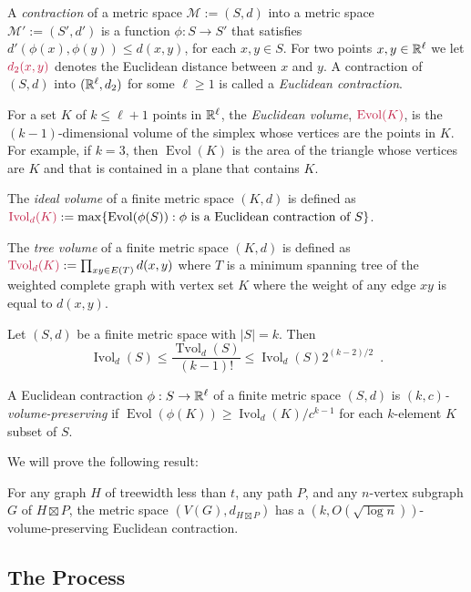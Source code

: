 \documentclass{patmorin}
\makeatletter
\newcommand{\defin}[1]{\emph{\textcolor{brightmaroon}{#1}}}
\def\mathcolor#1#{\@mathcolor{#1}}
\def\@mathcolor#1#2#3{%
  \protect\leavevmode
  \begingroup
    \color#1{#2}#3%
  \endgroup
}
\newcommand{\mathdefin}[1]{\mathcolor{brightmaroon}{#1}}
\DeclareMathOperator{\evol}{Evol}
\DeclareMathOperator{\ivol}{Ivol}
\DeclareMathOperator{\tvol}{Tvol}
\makeatother
\begin{document}
A \defin{contraction} of a metric space $\mathcal{M}:=(S,d)$ into a metric space $\mathcal{M'}:=(S',d')$ is a function $\phi:S\to S'$ that satisfies $d'(\phi(x),\phi(y))\le d(x,y)$, for each $x,y\in S$.  For two points $x,y\in\mathbb{R}^\ell$ we let $\mathdefin{d_2(x,y)}$ denotes the Euclidean distance between $x$ and $y$.  A contraction of $(S,d)$ into $(\mathbb{R}^\ell, d_2)$ for some $\ell\ge 1$ is called a \defin{Euclidean contraction}.


For a set $K$ of $k\le \ell+1$ points in $\mathbb{R}^\ell$, the \defin{Euclidean volume}, $\mathdefin{\evol(K)}$, is the $(k-1)$-dimensional volume of the simplex whose vertices are the points in $K$.  For example, if $k=3$, then $\evol(K)$ is the area of the triangle whose vertices are $K$ and that is contained in a plane that contains $K$.

The \defin{ideal volume} of a finite metric space $(K,d)$ is defined as $\mathdefin{\ivol_d(K)}:=\max\{\evol(\phi(S)):\text{$\phi$ is a Euclidean contraction of $S$}\}$.

The \defin{tree volume} of a finite metric space $(K,d)$ is defined as $\mathdefin{\tvol_d(K)}:=\prod_{xy\in E(T)} d(x,y)$ where $T$ is a minimum spanning tree of the weighted complete graph with vertex set $K$ where the weight of any edge $xy$ is equal to $d(x,y)$.

\begin{thm}
  Let $(S,d)$ be a finite metric space with $|S|=k$.  Then
  \[
    \ivol_{d}(S) \le \frac{\tvol_d(S)}{(k-1)!} \le \ivol_d(S)2^{(k-2)/2} \enspace .
  \]
\end{thm}


A Euclidean contraction $\phi:S\to\mathbb{R}^{\ell}$ of a finite metric space $(S,d)$ is \defin{$(k,c)$-volume-preserving} if $\evol(\phi(K))\ge \ivol_d(K)/c^{k-1}$ for each $k$-element $K$ subset of $S$.

We will prove the following result:

\begin{lem}
  For any graph $H$ of treewidth less than $t$, any path $P$, and any $n$-vertex subgraph $G$ of $H\boxtimes P$, the metric space $(V(G),d_{H\boxtimes P})$ has a $(k,O(\sqrt{\log n}))$-volume-preserving Euclidean contraction.
\end{lem}



\subsection{The Process}
\end{document}
